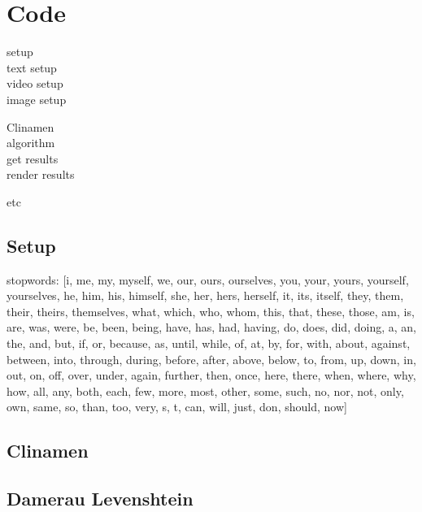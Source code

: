 
\chapter{Code}
\label{app:code}

setup\\
 text setup\\
 video setup\\
 image setup

Clinamen\\
 algorithm\\
 get results\\
 render results

 etc

\section{Setup}


stopwords:
[i, me, my, myself, we, our, ours, ourselves, you, your, yours, yourself, yourselves, he, him, his, himself, she, her, hers, herself, it, its, itself, they, them, their, theirs, themselves, what, which, who, whom, this, that, these, those, am, is, are, was, were, be, been, being, have, has, had, having, do, does, did, doing, a, an, the, and, but, if, or, because, as, until, while, of, at, by, for, with, about, against, between, into, through, during, before, after, above, below, to, from, up, down, in, out, on, off, over, under, again, further, then, once, here, there, when, where, why, how, all, any, both, each, few, more, most, other, some, such, no, nor, not, only, own, same, so, than, too, very, s, t, can, will, just, don, should, now]

\section{Clinamen}



\section{Damerau Levenshtein}


